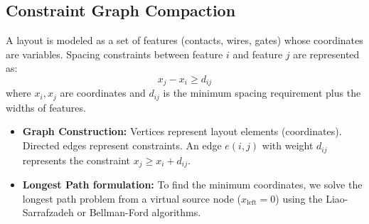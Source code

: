 \documentclass[12pt,a4paper]{article}
\begin{document}
\subsection{Constraint Graph Compaction}
A layout is modeled as a set of features (contacts, wires, gates) whose coordinates are variables. Spacing constraints between feature $i$ and feature $j$ are represented as:
\begin{equation}
  x_j - x_i \ge d_{ij}
\end{equation}
where $x_i, x_j$ are coordinates and $d_{ij}$ is the minimum spacing requirement plus the widths of features.
\begin{itemize}[leftmargin=*, itemsep=2pt]
  \item \textbf{Graph Construction:} Vertices represent layout elements (coordinates). Directed edges represent constraints. An edge $e(i, j)$ with weight $d_{ij}$ represents the constraint $x_j \ge x_i + d_{ij}$.
  \item \textbf{Longest Path formulation:} To find the minimum coordinates, we solve the longest path problem from a virtual source node ($x_{\text{left}} = 0$) using the Liao-Sarrafzadeh or Bellman-Ford algorithms.
\end{itemize}
\end{document}
